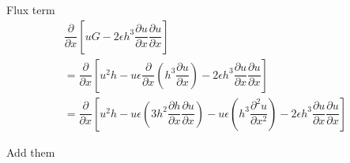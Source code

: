 \documentclass[10pt]{article}
\begin{document}
Flux term
\begin{multline}
\dfrac{\partial}{\partial x} \left[uG -2\epsilon h^3 \dfrac{\partial u}{\partial x} \dfrac{\partial u}{\partial x}\right] \\ =  \dfrac{\partial}{\partial x} \left[u^2h - u\epsilon\dfrac{\partial }{\partial x} \left (h^3 \dfrac{\partial u}{\partial x} \right ) -2\epsilon h^3 \dfrac{\partial u}{\partial x} \dfrac{\partial u}{\partial x} \right]\\ =  \dfrac{\partial}{\partial x} \left[u^2h - u\epsilon\left (3h^2 \dfrac{\partial h}{\partial x} \dfrac{\partial u}{\partial x} \right ) - u\epsilon \left(h^3 \dfrac{\partial^2 u}{\partial x^2} \right) -2\epsilon h^3 \dfrac{\partial u}{\partial x} \dfrac{\partial u}{\partial x} \right]
\end{multline}

Add them
\end{document}
